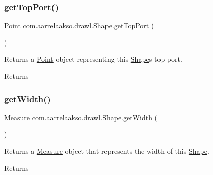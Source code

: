 \subsubsection{\texorpdfstring{get\+Top\+Port()}{getTopPort()}}
{\footnotesize\ttfamily \hyperlink{classcom_1_1aarrelaakso_1_1drawl_1_1_point}{Point} com.\+aarrelaakso.\+drawl.\+Shape.\+get\+Top\+Port (\begin{DoxyParamCaption}{ }\end{DoxyParamCaption})}



Returns a \hyperlink{classcom_1_1aarrelaakso_1_1drawl_1_1_point}{Point} object representing this \hyperlink{classcom_1_1aarrelaakso_1_1drawl_1_1_shape}{Shape}\textquotesingle{}s top port. 

\begin{DoxyReturn}{Returns}

\end{DoxyReturn}
\mbox{\label{classcom_1_1aarrelaakso_1_1drawl_1_1_shape_a3e2c58984f1bcbc2e9e86cf30868561e}} 
\subsubsection{\texorpdfstring{get\+Width()}{getWidth()}}
{\footnotesize\ttfamily \hyperlink{classcom_1_1aarrelaakso_1_1drawl_1_1_measure}{Measure} com.\+aarrelaakso.\+drawl.\+Shape.\+get\+Width (\begin{DoxyParamCaption}{ }\end{DoxyParamCaption})}



Returns a \hyperlink{classcom_1_1aarrelaakso_1_1drawl_1_1_measure}{Measure} object that represents the width of this \hyperlink{classcom_1_1aarrelaakso_1_1drawl_1_1_shape}{Shape}. 

\begin{DoxyReturn}{Returns}

\end{DoxyReturn}
\mbox{\label{classcom_1_1aarrelaakso_1_1drawl_1_1_shape_a037a5515b2a6e1df1d1981aa5516e78e}} 
